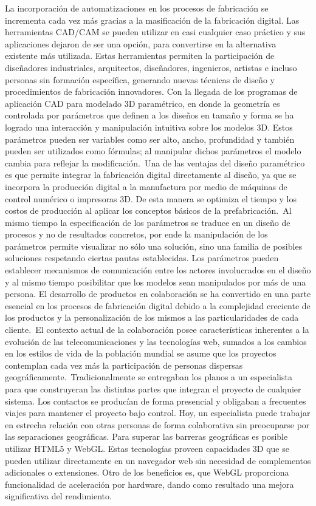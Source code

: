 La incorporación de automatizaciones en los procesos de fabricación se incrementa cada vez más gracias a la masificación de la fabricación digital. Las herramientas CAD/CAM se pueden utilizar en casi cualquier caso práctico y sus aplicaciones dejaron de ser una opción, para convertirse en la alternativa existente más utilizada. Estas herramientas permiten la participación de diseñadores industriales, arquitectos, diseñadores, ingenieros, artistas e incluso personas sin formación específica, generando nuevas técnicas de diseño y procedimientos de fabricación innovadores.
Con  la llegada de los programas de aplicación CAD para modelado 3D paramétrico, en donde la geometría es controlada por parámetros que definen a los diseños en tamaño y forma se ha logrado una interacción y manipulación intuitiva sobre los modelos 3D. Estos parámetros pueden ser variables como ser alto, ancho, profundidad y también pueden ser utilizados como fórmulas; al manipular dichos parámetros el modelo cambia para reflejar la modificación.\
Una de las ventajas del diseño paramétrico es que permite integrar la fabricación digital directamente al diseño, ya que se incorpora la producción digital a la manufactura por medio de máquinas de control numérico o impresoras 3D. De esta manera se optimiza el tiempo y los costos de producción al aplicar los conceptos básicos de la prefabricación.\
Al mismo tiempo la especificación de los parámetros se traduce en un diseño de procesos y no de resultados concretos, por ende la manipulación de los parámetros permite visualizar no sólo una solución, sino una familia de posibles soluciones respetando ciertas pautas establecidas. Los parámetros pueden establecer mecanismos de comunicación entre los actores involucrados en el diseño y al mismo tiempo posibilitar que los modelos sean manipulados por más de una persona.
El desarrollo de productos en colaboración se ha convertido en una parte esencial en los procesos de fabricación digital debido a la complejidad creciente de los productos y la personalización de los mismos a las particularidades de cada cliente.\
El contexto actual de la colaboración posee características inherentes a la evolución de las telecomunicaciones y las tecnologías web, sumados a los cambios en los estilos de vida de la población mundial se asume que los proyectos contemplan cada vez más la participación de personas dispersas geográficamente.\
Tradicionalmente se entregaban los planos a un especialista para que construyeran las distintas partes que integran el proyecto de cualquier sistema. Los contactos se producían de forma presencial y obligaban a frecuentes viajes para mantener el proyecto bajo control. Hoy, un especialista puede trabajar en estrecha relación con otras personas de forma colaborativa sin preocuparse por las separaciones geográficas.
Para superar las barreras geográficas es posible utilizar HTML5 y WebGL. Estas tecnologías proveen capacidades 3D que se pueden utilizar directamente en un navegador web sin necesidad de complementos adicionales o extensiones. Otro de los beneficios es, que WebGL proporciona funcionalidad de aceleración por hardware, dando como resultado una mejora significativa del rendimiento.\

